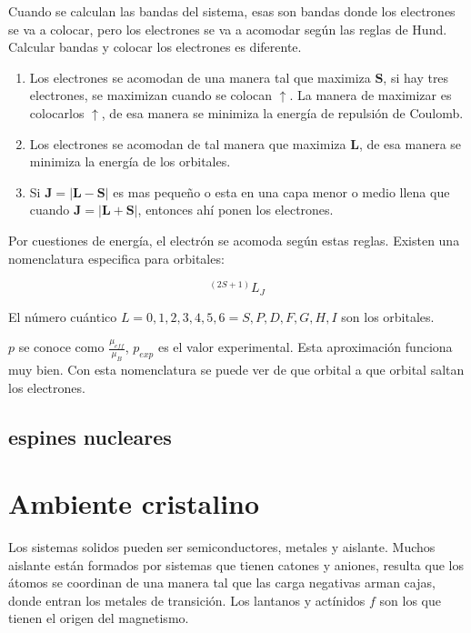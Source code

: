 \documentclass[11pt,fleqn]{book}
\renewcommand{\vec}[1]{\mathbf{#1}}
\begin{document}
Cuando se calculan las bandas del sistema, esas son bandas donde los electrones se va a colocar, pero los electrones se va a acomodar según las reglas de Hund. Calcular bandas y colocar los electrones es diferente.

\begin{enumerate}
    \item Los electrones se acomodan de una manera tal que maximiza $\vec{S}$, si hay tres electrones, se maximizan cuando se colocan $\uparrow$. La manera de maximizar es colocarlos $\uparrow$, de esa manera se minimiza la energía de repulsión de Coulomb.  
    \item Los electrones se acomodan de tal manera que maximiza $\vec{L}$, de esa manera se minimiza la energía de los orbitales. 
    \item Si $\vec{J}=|\vec{L}-\vec{S}|$ es mas pequeño o esta en una capa menor o medio llena que cuando $\vec{J}=|\vec{L}+\vec{S}|$, entonces ahí ponen los electrones. 
\end{enumerate}

Por cuestiones de energía, el electrón se acomoda según estas reglas. Existen una nomenclatura especifica para orbitales:

\begin{equation}
    ^{(2S+1)}L_{J}
    \label{Eq. 3.41}
\end{equation}

El número cuántico $L=0, 1, 2, 3, 4, 5, 6=S, P, D, F, G, H, I$ son los orbitales.


$p$ se conoce como $\frac{\mu_{eff}}{\mu_{B}}$, $p_{exp}$ es el valor experimental. Esta aproximación funciona muy bien. Con esta nomenclatura se puede ver de que orbital a que orbital saltan los electrones.

\section{espines nucleares}


    
\chapter{Ambiente cristalino}

Los sistemas solidos pueden ser semiconductores, metales y aislante. Muchos aislante están formados por sistemas que tienen catones y aniones, resulta que los átomos se coordinan de una manera tal que las carga negativas arman cajas, donde entran los metales de transición. Los lantanos y actínidos $f$ son los que tienen el origen del magnetismo. 
\end{document}
